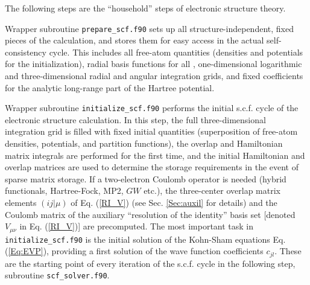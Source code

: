 The following steps are the ``household'' steps of electronic
structure theory. 

Wrapper subroutine \texttt{prepare\_scf.f90} sets up
all structure-independent, fixed pieces of the calculation, and stores
them for easy access in the actual self-consistency cycle. This
includes all free-atom quantities (densities and potentials for the
initialization), radial basis functions for all ,
one-dimensional logarithmic and three-dimensional radial and angular
integration grids, and fixed coefficients for the analytic long-range
part of the Hartree potential.

Wrapper subroutine \texttt{initialize\_scf.f90} performs the initial
s.c.f. cycle of the electronic structure calculation. In this step,
the full three-dimensional integration grid is filled with fixed
initial quantities (superposition of free-atom densities, 
potentials, and partition functions), the overlap and Hamiltonian
matrix integrals are performed for the first time, and the initial
Hamiltonian and overlap matrices are used to determine the storage
requirements in the event of sparse matrix storage. If a two-electron
Coulomb operator is needed (hybrid functionals, Hartree-Fock, MP2,
$GW$ etc.), the three-center overlap matrix elements $(ij|\mu)$ of
Eq. (\ref{RI_V}) (see Sec. \ref{Sec:auxil} for details) and the
Coulomb matrix of the auxiliary ``resolution of the identity'' basis set
[denoted $V_{\mu\nu}$ in Eq. (\ref{RI_V})] are precomputed. 
The most important task in \texttt{initialize\_scf.f90} is the initial
solution of the Kohn-Sham equations Eq. (\ref{Eq:EVP}), providing a
first solution of the wave function coefficients $c_{jl}$. These are
the starting point of every iteration of the s.c.f. cycle in the
following step, subroutine \texttt{scf\_solver.f90}. 

